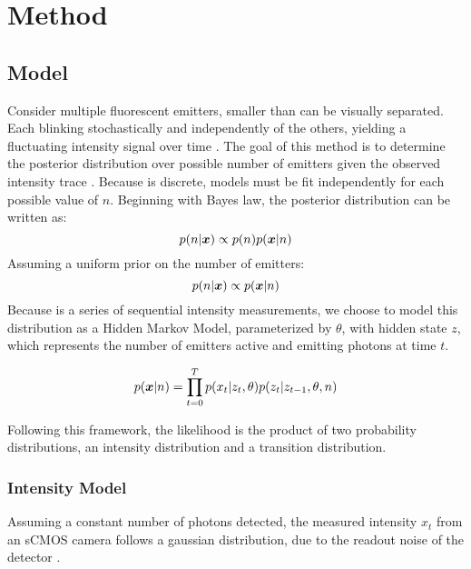 \section{Method}

\subsection{Model}
Consider multiple fluorescent emitters, smaller than can be visually separated.
  Each blinking stochastically and independently of the others, 
  yielding a fluctuating intensity signal over time .
  The goal of this method is to determine the posterior distribution over 
  possible number of emitters \ndist given the observed intensity trace \trace.
  Because \ndist is discrete, models must be fit independently for each possible value of $n$.
  Beginning with Bayes law, the posterior distribution can be written as:
  \begin{equation*}
    p(n | \bm{x}) \propto p(n) p(\bm{x} | n)
  \end{equation*}
  Assuming a uniform prior on the number of emitters:
  \begin{equation*}
    p(n | \bm{x}) \propto p(\bm{x} | n)
  \end{equation*}
  Because \trace is a series of sequential intensity measurements, 
    we choose to model this distribution as a Hidden Markov Model, parameterized by $\theta$,
     with hidden state $z$, which represents the number of emitters active and emitting photons at time $t$.
    

  \begin{equation}
    p(\bm{x}| n) = \prod_{t=0}^{T} p(x_{t} | z_{t}, \theta) p(z_{t} | z_{t-1}, \theta, n)
    \label{eq:method:HMM}
  \end{equation}

  Following this framework, the likelihood is the product of two probability distributions,
  an intensity distribution and a transition distribution. 

\subsubsection{Intensity Model}
Assuming a constant number of photons detected, the measured intensity $x_{t}$ from an sCMOS
  camera follows a gaussian distribution, due to the readout noise of the detector .


